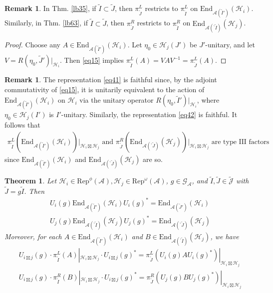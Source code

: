 \documentclass[11pt,b5paper,notitlepage]{article}
\theoremstyle{definition}
\newtheorem{rem}[df]{Remark}
\theoremstyle{plain}
\newtheorem{thm}[df]{Theorem}
\newcommand{\wtd}{\widetilde}
\newcommand{\End}{\mathrm{End}} %
\newcommand{\Rep}{\mathrm{Rep}}
\newcommand{\GA}{\mathscr G_{\mathcal A}}
\newcommand{\Jtd}{\widetilde{\mathcal J}}
\newcommand{\bpr}{{}^\backprime}
\newcommand{\MA}{\mathcal A}
\newcommand{\MH}{\mathcal H}
\numberwithin{equation}{section}
\begin{document}
\begin{rem}\label{lb61}
In Thm. \ref{lb35}, if $\wtd I\subset\wtd J$, then $\pi^L_{\wtd J}$ restricts to $\pi^L_{\wtd I}$ on $\End_{\MA(\wtd I')}(\MH_i)$. Similarly, in Thm. \ref{lb63}, if $\wtd I\subset\wtd J$, then $\pi^R_{\wtd J}$ restricts to $\pi^R_{\wtd I}$ on $\End_{\MA(\bpr\wtd I)}(\MH_j)$.
\end{rem}

\begin{proof}
Choose any $A\in\End_{\MA(\wtd I')}(\MH_i)$. Let $\eta_0\in\MH_j(J')$ be $J'$-unitary, and let $V=R(\eta_0,\wtd J')|_{\MH_i}$. Then \eqref{eq15} implies $\pi^L_{\wtd I}(A)=VAV^{-1}=\pi^L_{\wtd J}(A)$. 
\end{proof}



\begin{rem}\label{lb91}
The representation \eqref{eq41} is faithful since, by the adjoint commutativity of \eqref{eq15}, it is unitarily equivalent to the action of $\End_{\MA(\wtd I')}(\MH_i)$ on $\MH_i$ via the unitary operator $R(\eta_0,\wtd I')|_{\MH_i}$, where $\eta_0\in\MH_j(I')$ is $I'$-unitary. Similarly, the representation \eqref{eq42} is faithful. It follows that
\begin{align*}
\pi^L_{\wtd I}(\End_{\MA(\wtd I')}(\MH_i))\big|_{\MH_i\boxtimes\MH_j}\text{ and } \pi^R_{\wtd J}(\End_{\MA(\bpr\wtd J)}(\MH_j))\big|_{\MH_i\boxtimes\MH_j}\text{ are type III factors}
\end{align*}
since $\End_{\MA(\wtd I')}(\MH_i)$ and $\End_{\MA(\bpr\wtd J)}(\MH_j)$ are so.
\end{rem}


\begin{thm}\label{lb108}
Let $\MH_i\in\Rep^\phi(\MA),\MH_j\in\Rep^\omega(\MA)$, $g\in\GA$, and $\wtd I,\wtd J\in\Jtd$ with $\wtd J=g\wtd I$. Then
\begin{gather*}
U_i(g)\End_{\MA(\wtd I')}(\MH_i)U_i(g)^*=\End_{\MA(\wtd J')}(\MH_i)\\ 
U_j(g)\End_{\MA(\bpr\wtd I)}(\MH_j)U_j(g)^*=\End_{\MA(\bpr\wtd J)}(\MH_j)
\end{gather*}
Moreover, for each $A\in \End_{\MA(\wtd I')}(\MH_i)$ and $B\in \End_{\MA(\bpr\wtd I)}(\MH_j)$, we have
\begin{gather*}
U_{i\boxtimes j}(g)\cdot\pi^L_{\wtd I}(A)|_{\MH_i\boxtimes\MH_j}\cdot U_{i\boxtimes j}(g)^*=\pi^L_{\wtd J}(U_i(g)AU_i(g)^*)|_{\MH_i\boxtimes\MH_j}\\
U_{i\boxtimes j}(g)\cdot\pi^R_{\wtd I}(B)|_{\MH_i\boxtimes\MH_j}\cdot U_{i\boxtimes j}(g)^*=\pi^R_{\wtd J}(U_j(g)BU_j(g)^*)|_{\MH_i\boxtimes\MH_j}
\end{gather*}
\end{thm}
\end{document}
